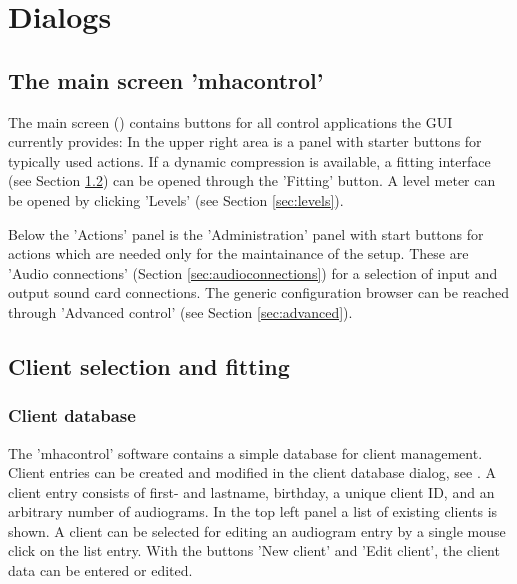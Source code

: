 \documentclass[11pt,a4paper,twoside]{article}
\newcommand{\+}{\discretionary{\mbox{\scriptsize$\hookleftarrow$}}{}{}}
\begin{document}
\section{Dialogs}

\subsection{The main screen 'mhacontrol'}

The main screen () contains buttons for all control applications the GUI currently provides:
%
In the upper right area is a panel with starter buttons for typically
used actions.
%
If a dynamic compression is available, a fitting interface (see
Section \ref{sec:fitting}) can be opened through the 'Fitting' button.
%
A level meter can be opened by clicking 'Levels' (see Section
\ref{sec:levels}).

Below the 'Actions' panel is the 'Administration'
panel with start buttons for actions which are
needed only for the maintainance of the \mha{} setup.
%
These are 'Audio connections' (Section \ref{sec:audioconnections}) for
a selection of input and output sound card connections.
%
The generic \mha{} configuration browser can be reached through 'Advanced
control' (see Section \ref{sec:advanced}).


\subsection{Client selection and fitting}\label{sec:fitting}

\subsubsection*{Client database}

The 'mhacontrol' software contains a simple database for client management.
%
Client entries can be created and modified in the client database
dialog, see .
%
A client entry consists of first- and lastname, birthday, a unique
client ID, and an arbitrary number of
audiograms.
%
In the top left panel a list of existing clients is shown.
%
A client can be selected for editing an audiogram entry by a single
mouse click on the list entry.
%
With the buttons 'New client' and 'Edit client', the client data can
be entered or edited.
\end{document}
